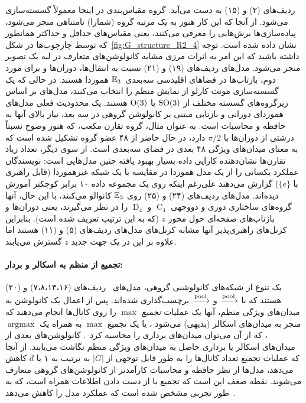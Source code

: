 ردیف‌های (۲) و (۱۵)
به دست می‌آید.
گروه مقیاس‌بندی در اینجا معمولاً گسسته‌سازی می‌شود.
از آنجا که این کار هنوز به یک مرتبه گروه (شمارا) نامتناهی منجر می‌شود، پیاده‌سازی‌ها برش‌هایی را معرفی می‌کنند، یعنی مقیاس‌های حداقل و حداکثر همانطور که توسط چارچوب‌ها در شکل~\ref{fig:G_structure_R2_4} نشان داده شده است.
توجه داشته باشید که این امر به اثرات مرزی مشابه کانولوشن‌های متعارف در لبه یک تصویر منجر می‌شود.
%
مدل‌های 
ردیف‌های (۱۹) و (۲۱)
نسبت به انتقال‌ها، دوران‌ها و برای مورد دوم، بازتاب‌ها در فضاهای اقلیدسی سه‌بعدی~$\mathbb{E}_3$ هموردا هستند.
در حالی که \citet{finzi2020generalizing} یک گسسته‌سازی مونت کارلو از نمایش منظم را انتخاب می‌کنند،
مدل‌های \cite{Worrall2018-CUBENET,winkels3DGCNNsPulmonary2018} بر اساس زیرگروه‌های گسسته مختلف از $\operatorname{SO}(3)$ یا $\operatorname{O}(3)$ هستند.
یک محدودیت فعلی مدل‌های هموردای دورانی و بازتابی مبتنی بر کانولوشن گروهی در سه بعد، نیاز بالای آنها به حافظه و محاسبات است.
به عنوان مثال، گروه تقارن مکعب، که هنوز وضوح نسبتاً درشتی از دوران‌ها با $\pi/2$ دارد، در حال حاضر از ۴۸ عضو گروه تشکیل شده است که به معنای میدان‌های ویژگی ۴۸ بعدی در فضای سه‌بعدی است.
از سوی دیگر، تعداد زیاد تقارن‌ها نشان‌دهنده کارایی داده بسیار بهبود یافته چنین مدل‌هایی است:
نویسندگان \cite{winkels3DGCNNsPulmonary2018} عملکرد یکسانی را از یک مدل هموردا در مقایسه با یک شبکه غیرهموردا (قابل راهبری با $\{e\}$) گزارش می‌دهند علی‌رغم اینکه روی یک مجموعه داده ۱۰ برابر کوچکتر آموزش دیده‌اند.
%
مدل‌های 
ردیف‌های (۲۴) و (۲۵)
روی $\mathbb{E}_3$ کانوالو می‌کنند، با این حال، آنها گروه‌های ساختاری دوری و دووجهی $\operatorname{C}_4$ و $\operatorname{D}_4$ را در نظر می‌گیرند، یعنی دوران‌ها و بازتاب‌های صفحه‌ای حول محور $z$ (که به این ترتیب تعریف شده است).
بنابراین کرنل‌های راهبری‌پذیر آنها مشابه کرنل‌های مدل‌های 
ردیف‌های (۵) و (۱۱)
هستند اما علاوه بر این در یک جهت جدید $z$ گسترش می‌یابند.


\paragraph{تجمیع از منظم به اسکالر و بردار:}
یک تنوع از شبکه‌های کانولوشنی گروهی، مدل‌های 
ردیف‌های (۷،۸،۱۳،۱۶) و (۲۰)
هستند که با $\xrightarrow{\textup{pool}}$ و $\xrightarrow{\textup{pool}}$ برچسب‌گذاری شده‌اند.
پس از اعمال یک کانولوشن به میدان‌های ویژگی منظم، آنها یک عملیات \emph{تجمیع} $\operatorname{max}$ را روی کانال‌ها انجام می‌دهند که منجر به میدان‌های اسکالر (بدیهی) می‌شود \cite{Cohen2016-GCNN,marcos2016learning,Weiler2019_E2CNN,ghosh2019scale,andrearczyk2019exploring}، یا یک تجمیع $\operatorname{max}$ به همراه یک $\operatorname{argmax}$، که از آن می‌توان میدان‌های برداری را محاسبه کرد~\cite{Marcos2017-VFN,Weiler2019_E2CNN}.
کانولوشن‌های بعدی از میدان‌های اسکالر یا برداری حاصل به میدان‌های ویژگی منظم نگاشت می‌یابند.
از آنجا که عملیات تجمیع تعداد کانال‌ها را به طور قابل توجهی از $|G|$ به ترتیب به ۱ یا $d$ کاهش می‌دهد، مدل‌ها از نظر حافظه و محاسبات کارآمدتر از کانولوشن‌های گروهی متعارف می‌شوند.
نقطه ضعف این است که تجمیع با از دست دادن اطلاعات همراه است، که به طور تجربی مشخص شده است که عملکرد مدل را کاهش می‌دهد~\cite{Weiler2019_E2CNN}.



